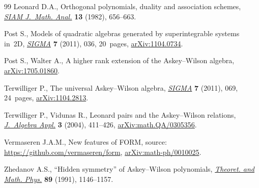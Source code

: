 \documentclass[10pt,a4paper]{amsart}
\numberwithin{equation}{section}
\theoremstyle{definition}
\begin{document}
\begin{thebibliography}{99}
Leonard D.A., Orthogonal polynomials, duality and association schemes,
 \href{https://doi.org/10.1137/0513044}{\textit{SIAM J.~Math. Anal.}} \textbf{13} (1982), 656--663.

Post S., Models of quadratic algebras generated by superintegrable systems
 in~2{D}, \href{https://doi.org/10.3842/SIGMA.2011.036}{\textit{SIGMA}} \textbf{7} (2011), 036, 20~pages, \href{https://arxiv.org/abs/#2}{arXiv:1104.0734}.

Post S., Walter A., A higher rank extension of the {A}skey--{W}ilson algebra,
 \href{https://arxiv.org/abs/1705.01860}{arXiv:1705.01860}.

Terwilliger P., The universal {A}skey--{W}ilson algebra, \href{https://doi.org/10.3842/SIGMA.2011.069}{\textit{SIGMA}}
 \textbf{7} (2011), 069, 24~pages, \href{https://arxiv.org/abs/1104.2813}{arXiv:1104.2813}.

Terwilliger P., Vidunas R., Leonard pairs and the {A}skey--{W}ilson relations,
 \href{https://doi.org/10.1142/S0219498804000940}{\textit{J.~Algebra Appl.}} \textbf{3} (2004), 411--426,
 \href{https://arxiv.org/abs/math.QA/0305356}{arXiv:math.QA/0305356}.

Vermaseren J.A.M., New features of {FORM}, source:
 \url{https://github.com/vermaseren/form}, \href{https://arxiv.org/abs/math-ph/0010025}{arXiv:math-ph/0010025}.

Zhedanov A.S., ``{H}idden symmetry'' of {A}skey--{W}ilson polynomials,
 \href{https://doi.org/10.1007/BF01015906}{\textit{Theoret. and Math. Phys.}} \textbf{89} (1991), 1146--1157.

\end{thebibliography}
\end{document}
